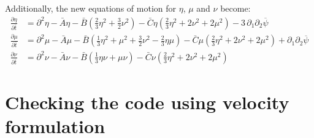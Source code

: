 \documentclass[reqno]{article}
\begin{document}
	Additionally, the new equations of motion for $\eta$, $\mu$ and $\nu$ become:
	\begin{equation}\label{eq:dimensionless-flow-eoms}
	\begin{split}
		\frac{\partial \eta}{\partial \bar{t}} &= \partial^2 \eta - \bar{A}\eta - \bar{B}\left( \tfrac 23 \eta^2 + \tfrac 32 \nu^2\right) - \bar{C} \eta \left( \tfrac23 \eta^2 + 2\nu^2 + 2\mu^2\right) - 3\,\partial_1 \partial_2 \overline{\psi} \\
		\frac{\partial \mu}{\partial \bar{t}} &= \partial^2 \mu - \bar{A}\mu - \bar{B}\left( \tfrac13 \eta^2 + \mu^2 + \tfrac32 \nu^2 - \tfrac23 \eta \mu \right) - \bar{C}\mu\left(\tfrac23 \eta^2 + 2\nu^2 + 2\mu^2\right) + \partial_1 \partial_2 \overline{\psi} \\
		\frac{\partial \nu}{\partial \bar{t}} &= \partial^2 \nu - \bar{A}\nu - \bar{B}\left( \tfrac13\eta\nu + \mu\nu \right) - \bar{C}\nu\left(\tfrac23\eta^2 + 2\nu^2 + 2\mu^2\right)
	\end{split}
	\end{equation}
	
	\section{Checking the code using velocity formulation}
\end{document}
